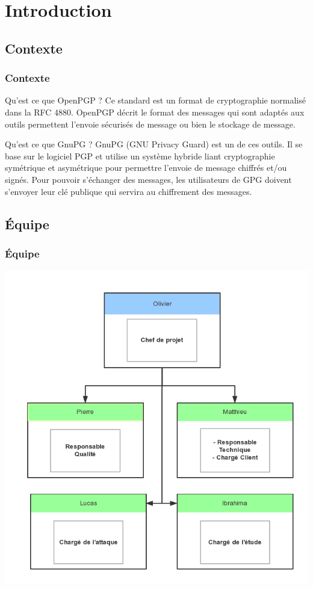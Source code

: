 \section{Introduction}
\subsection{Contexte}
\begin{frame}
    \frametitle{\color{white}Contexte}
    \begin{block}{Qu'est ce que OpenPGP ?}
    	Ce standard est un format de cryptographie normalisé dans la RFC 4880.
      OpenPGP décrit le format des messages qui sont adaptés aux outils permettent l’envoie sécurisés
      de message ou bien le stockage de message.
    \end{block}
    \begin{block}{Qu'est ce que GnuPG ?}
      GnuPG (GNU Privacy Guard) est un de ces outils. Il se base sur le logiciel PGP et utilise un système hybride liant
      cryptographie symétrique et asymétrique pour permettre l’envoie de message chiffrés et/ou signés. Pour
      pouvoir s’échanger des messages, les utilisateurs de GPG doivent s’envoyer leur clé publique qui servira au
      chiffrement des messages.
    \end{block}
\end{frame}

\subsection{Équipe}
\begin{frame}
    \frametitle{\color{white}Équipe}
  \begin{center}
    \includegraphics[scale=0.30]{guipgteam.png}
  \end{center}
\end{frame}
